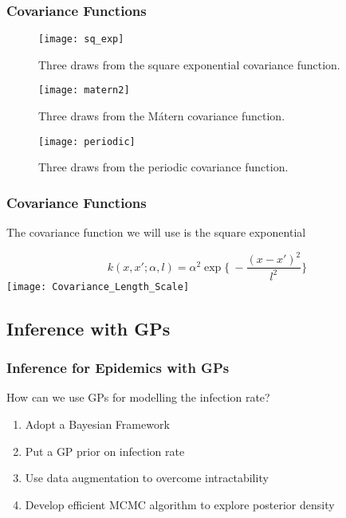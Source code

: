 \documentclass[demo]{beamer}
\begin{document}
\begin{frame}
	\frametitle{Covariance Functions}
	\centering
	\begin{figure}
		\texttt{[image: sq\_exp]}
		\caption{Three draws from the square exponential covariance function.}
		\texttt{[image: matern2]}
		\caption{Three draws from the M\'atern covariance function.}
		\texttt{[image: periodic]}
		\caption{Three draws from the periodic covariance function.}
	\end{figure}
\end{frame}

\begin{frame}
	\frametitle{Covariance Functions}
	The covariance function we will use is the square exponential
	
	$$
	k(x, x'; \alpha, l) = \alpha^2\exp\Big\{\ -\frac{(x-x')^2}{l^2} \Big\}
	$$
	\vspace{2em}
	\centering
	\texttt{[image: Covariance\_Length\_Scale]} \\
	
\end{frame}




\subsection{Inference with GPs}
\begin{frame}
	\frametitle{Inference for Epidemics with GPs}
	How can we use GPs for modelling the infection rate? 
	\begin{enumerate}
		\item Adopt a Bayesian Framework
		\item Put a GP prior on infection rate
		\item Use data augmentation to overcome intractability
		\item Develop efficient MCMC algorithm to explore posterior density 
	\end{enumerate}
	\nocite{Xu16}
\end{frame}
\end{document}
